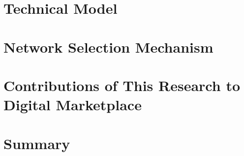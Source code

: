 \section{Technical Model} %
\label{sec:technical_model_dmp}


\section{Network Selection Mechanism} %
\label{sec:network_selection_mechanism_dmp}


\section{Contributions of This Research to Digital Marketplace} %
\label{sec:contributions_of_this_research_to_digital_marketplace_dmp}


\section{Summary} %
\label{sec:summary_dmp}

